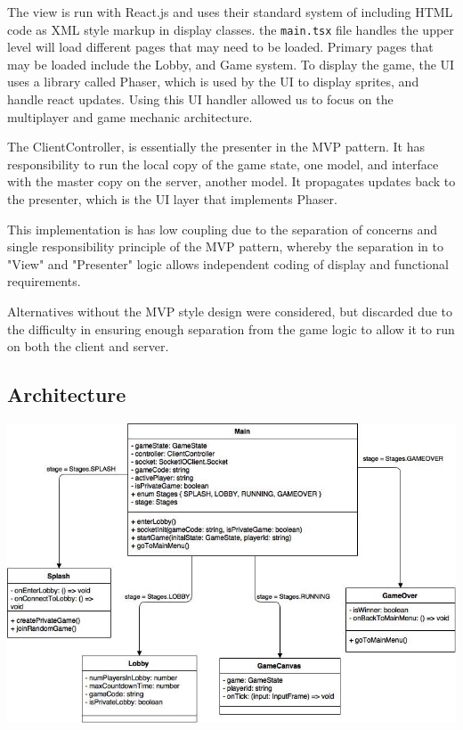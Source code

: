 \documentclass[12pt]{report}
\begin{document}
The view is run with React.js and uses their standard system of including HTML code as XML style markup in display classes. the \texttt{main.tsx} file handles the upper level will load different pages that may need to be loaded. Primary pages that may be loaded include the Lobby, and Game system. To display the game, the UI uses a library called Phaser, which is used by the UI to display sprites, and handle react updates. Using this UI handler allowed us to focus on the multiplayer and game mechanic architecture. 

The ClientController, is essentially the presenter in the MVP pattern. It has responsibility to run the local copy of the game state, one model, and interface with the master copy on the server, another model. It propagates updates back to the presenter, which is the UI layer that implements Phaser. 

This implementation is has low coupling due to the separation of concerns and single responsibility principle of the MVP pattern, whereby the separation in to "View" and "Presenter" logic allows independent coding of display and functional requirements. 

Alternatives without the MVP style design were considered, but discarded due to the difficulty in ensuring enough separation from the game logic to allow it to run on both the client and server. 

\subsection{Architecture}
\includegraphics[width=\linewidth]{images/client_arch.png}
\end{document}

